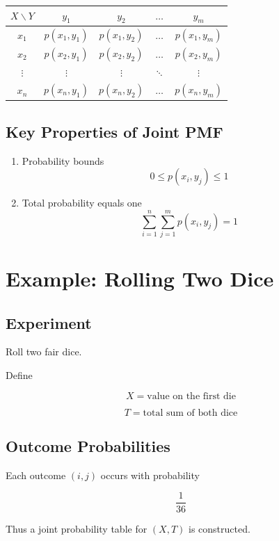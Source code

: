 \documentclass[12pt]{article}
\begin{document}
\begin{center}
\begin{tabular}{c|cccc}
$X \backslash Y$ & $y_1$ & $y_2$ & $\dots$ & $y_m$ \\
\hline
$x_1$ & $p(x_1,y_1)$ & $p(x_1,y_2)$ & $\dots$ & $p(x_1,y_m)$ \\
$x_2$ & $p(x_2,y_1)$ & $p(x_2,y_2)$ & $\dots$ & $p(x_2,y_m)$ \\
$\vdots$ & $\vdots$ & $\vdots$ & $\ddots$ & $\vdots$ \\
$x_n$ & $p(x_n,y_1)$ & $p(x_n,y_2)$ & $\dots$ & $p(x_n,y_m)$ \\
\end{tabular}
\end{center}

\subsection{Key Properties of Joint PMF}

\begin{enumerate}
\item Probability bounds
\[
0 \le p(x_i,y_j) \le 1
\]

\item Total probability equals one
\[
\sum_{i=1}^{n}\sum_{j=1}^{m} p(x_i,y_j) = 1
\]
\end{enumerate}

\section{Example: Rolling Two Dice}

\subsection{Experiment}

Roll two fair dice.

Define

\[
X = \text{value on the first die}
\]

\[
T = \text{total sum of both dice}
\]

\subsection{Outcome Probabilities}

Each outcome $(i,j)$ occurs with probability

\[
\frac{1}{36}
\]

Thus a joint probability table for $(X,T)$ is constructed.
\end{document}

